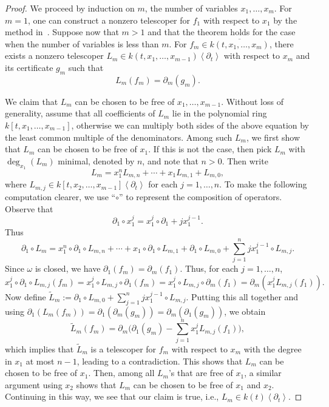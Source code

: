 \documentclass{amsart}
\theoremstyle{definition}
\numberwithin{equation}{section}
\numberwithin{thm}{section}
\begin{document}
\begin{proof}
	We proceed by induction on $m$, the number of variables $x_1,\ldots,x_m$. For $m=1$, one can construct a nonzero telescoper for $f_1$ with respect to $x_1$ by the method in~\cite{ChenKauersSinger2012,ChenKauersKoutschan2016}.
Suppose now that $m>1$ and that the theorem holds for the case when the number of variables is less than $m$. For $f_m \in \overline{k(t,x_1,\ldots,x_{m})}$, there exists a nonzero telescoper $L_m \in k(t,x_1,\ldots,x_{m-1})\left\langle \partial_t \right\rangle$ with respect to $x_m$ and its certificate $g_m$ such that
	\[L_m(f_m)=\partial_m(g_m).\]

We claim that $L_m$ can be chosen to be free of $x_1,\ldots,x_{m-1}$.  Without loss of generality, assume that all coefficients of $L_m$ lie in the polynomial ring $k[t,x_1,\ldots,x_{m-1}]$, otherwise we can multiply {both sides of the above equation by the least common multiple of the denominators}. Among such $L_m$, we first show that $L_m$ can be chosen to be free of $x_1$.  If this is not the case, then 
pick $L_m$ with $\deg_{x_1}(L_m)$ minimal, denoted by $n$, and note that $n > 0$.  Then write
	\[L_m = x_1^{n}L_{m,n}+\cdots+x_1L_{m,1}+L_{m,0}, \]
where $L_{m,j} \in k[t,x_2,\ldots,x_{m-1}]\left\langle \partial_t\right\rangle$ for each $j = 1,\ldots,n$.  To make the following computation clearer, we use ``$\circ$'' to represent the composition of operators. Observe that
\[
\partial_1\circ x_1^j = x_1^j \circ \partial_1 + j x_1^{j-1}.
\]
Thus
\[
\partial_1\circ L_m = x_1^n \circ \partial_1 \circ L_{m,n} + \cdots + x_1 \circ \partial_1 \circ L_{m,1}+ \partial_1 \circ L_{m,0}+ \sum_{j=1}^{n} j x_1^{j-1}\circ L_{m,j}.
\]
Since $\omega$ is closed, we have $\partial_1(f_m)= \partial_m (f_1)$. Thus, for each $j = 1, \ldots, n$,
\[
x_1^j \circ \partial_1 \circ L_{m,j} (f_m) = x_1 ^{j}\circ L_{m,j} \circ \partial_1 (f_m)= x_1 ^{j}\circ L_{m,j} \circ \partial_m (f_1)= \partial_m (x_1^jL_{m,j}(f_1)).
\]
Now define $\tilde{L}_m := \partial_1 \circ L_{m,0}+ \sum_{j=1}^{n} j x_1^{j-1}\circ L_{m,j}$.  Putting this all together and using $\partial_1(L_m(f_m))= \partial_1(\partial_m(g_m)) = \partial_m(\partial_1(g_m))$, we obtain
\[
\tilde{L}_m (f_m)=\partial_m\Big(\partial_1(g_m)-\sum_{j=1}^{n}x_1^j L_{m,j}(f_1)\Big),
\]
which implies that $\tilde{L}_m$ is a telescoper for $f_m$ with respect to $x_m$ with the degree {in $x_1$ at most} $n-1$, leading to a contradiction. This shows that $L_m$ can be chosen to be free of $x_1$.   Then, among all $L_m$'s that are free of $x_1$, a similar argument using $x_2$ shows that $L_m$ can be chosen to be free of $x_1$ and $x_2$.  Continuing in this way, we see that 
our claim is true, i.e., $L_m \in k(t)\left\langle \partial_t\right\rangle$.
	

\end{proof}
\end{document}
